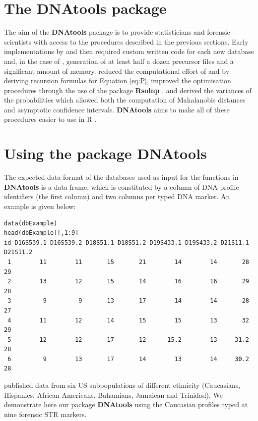 \documentclass[a4paper,11pt]{article}
\newcommand{\proglang}[1]{\textsf{#1}}
\newcommand{\pkg}[1]{\textbf{#1}}
\begin{document}
\section[DNAtools]{The \pkg{DNAtools} package}
The aim of the \pkg{DNAtools} package is to provide statisticians and
forensic scientists with access to the procedures described in the
previous sections. Early implementations by \cite{weir2004} and then
\cite{curran2007} required custom written code for each new database
and, in the case of \cite{curran2007}, generation of at least half a
dozen precursor files and a significant amount of memory.
\cite{tvedebrink2010,tvedebrink2011} reduced the computational
effort of \cite{weir2004} and \cite{curran2007} by deriving
recursion formulas for Equation \ref{eq:P}, improved the optimisation
procedures through the use of the package \pkg{Rsolnp} \citep{Rsolnp},
and derived the variances of the probabilities which allowed both the
computation of Mahalanobis distances and asymptotic confidence
intervals. \pkg{DNAtools} aims to make all of these procedures easier
to use in \proglang{R} \citep{rcore2010}.

\section[Using DNAtools]{Using the package \pkg{DNAtools}}
\label{sec:package}

The expected data format of the databases used as input for the
functions in \pkg{DNAtools} is a data frame, which is constituted by a
column of DNA profile identifiers (the first column) and two columns
per typed DNA marker. An example is given below: 
\begin{verbatim}
data(dbExample)
head(dbExample)[,1:9]
id D16S539.1 D16S539.2 D18S51.1 D18S51.2 D19S433.1 D19S433.2 D21S11.1 D21S11.2
 1        11        11       15       21        14        14       28       29
 2        13        12       15       14        16        16       29       28
 3         9         9       13       17        14        14       28       27
 4        11        12       14       15        15        13       32       29
 5        12        12       17       12      15.2        13     31.2       28
 6         9        13       17       14        13        14     30.2       28
\end{verbatim}

\cite{budowle_1999} published data from six US subpopulations of
different ethnicity (Caucasians, Hispanics, African Americans,
Bahamians, Jamaican and Trinidad). We demonstrate here our package
\pkg{DNAtools} using the Caucasian profiles typed at nine forensic STR
markers.
\end{document}
